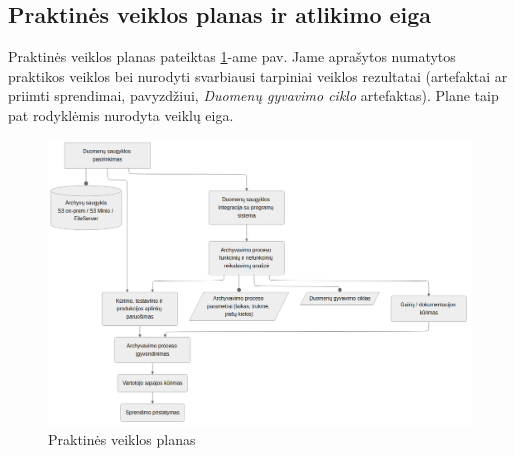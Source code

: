 \subsection*{Praktinės veiklos planas ir atlikimo eiga}

Praktinės veiklos planas pateiktas \ref{fig:plan}-ame pav. Jame aprašytos numatytos praktikos veiklos bei nurodyti svarbiausi tarpiniai veiklos rezultatai (artefaktai ar priimti sprendimai, pavyzdžiui, \textit{Duomenų gyvavimo ciklo} artefaktas). Plane taip pat rodyklėmis nurodyta veiklų eiga. 

\begin{figure}
    \centering
    \includegraphics[width=\textwidth]{images/plan.png}
    \caption{Praktinės veiklos planas}
    \label{fig:plan}
\end{figure}
